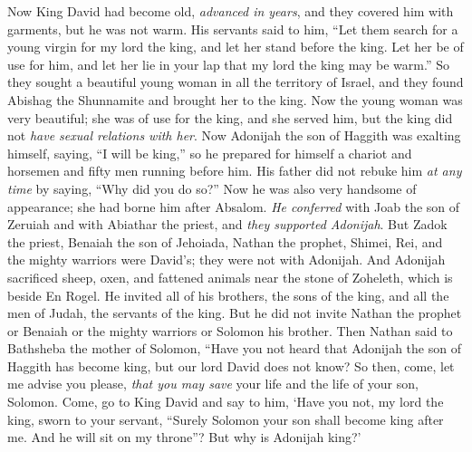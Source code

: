 
\begin{biblechapter} %
 Now King David had become old, \textit{advanced in years}, and they covered him with garments, but he was not warm.
\verse His servants said to him, “Let them search for a young virgin for my lord the king, and let her stand before the king. Let her be of use for him, and let her lie in your lap that my lord the king may be warm.”
\verse So they sought a beautiful young woman in all the territory of Israel, and they found Abishag the Shunnamite and brought her to the king.
\verse Now the young woman was very beautiful; she was of use for the king, and she served him, but the king did not \textit{have sexual relations with her}.
 Now Adonijah the son of Haggith was exalting himself, saying, “I will be king,” so he prepared for himself a chariot and horsemen and fifty men running before him.
\verse His father did not rebuke him \textit{at any time} by saying, “Why did you do so?” Now he was also very handsome of appearance; she had borne him after Absalom.
\verse \textit{He conferred} with Joab the son of Zeruiah and with Abiathar the priest, and \textit{they supported Adonijah}.
\verse But Zadok the priest, Benaiah the son of Jehoiada, Nathan the prophet, Shimei, Rei, and the mighty warriors were David’s; they were not with Adonijah.
\verse And Adonijah sacrificed sheep, oxen, and fattened animals near the stone of Zoheleth, which is beside En Rogel. He invited all of his brothers, the sons of the king, and all the men of Judah, the servants of the king.
\verse But he did not invite Nathan the prophet or Benaiah or the mighty warriors or Solomon his brother.
 Then Nathan said to Bathsheba the mother of Solomon, “Have you not heard that Adonijah the son of Haggith has become king, but our lord David does not know?
\verse So then, come, let me advise you please, \textit{that you may save} your life and the life of your son, Solomon.
\verse Come, go to King David and say to him, ‘Have you not, my lord the king, sworn to your servant, “Surely Solomon your son shall become king after me. And he will sit on my throne”? But why is Adonijah king?’

\end{biblechapter}
